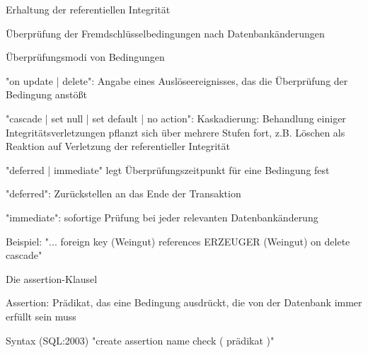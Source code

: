 \documentclass[a4paper]{article}
\begin{document}
\begin{multicols}{3}
\begin{itemize*}
    Erhaltung der referentiellen Integrität
    \begin{itemize*}
        \item Überprüfung der Fremdschlüsselbedingungen nach Datenbankänderungen
        \item Überprüfungsmodi von Bedingungen
        \begin{itemize*}
            \item "on update | delete": Angabe eines Auslöseereignisses, das die Überprüfung der Bedingung anstößt
            \item "cascade | set null | set default | no action": Kaskadierung: Behandlung einiger Integritätsverletzungen pflanzt sich über mehrere Stufen fort, z.B. Löschen als Reaktion auf Verletzung der referentieller Integrität
            \item "deferred | immediate" legt Überprüfungszeitpunkt für eine Bedingung fest
            \item "deferred": Zurückstellen an das Ende der Transaktion
            \item "immediate": sofortige Prüfung bei jeder relevanten Datenbankänderung
            \item Beispiel: "... foreign key (Weingut) references ERZEUGER (Weingut) on delete cascade"
        \end{itemize*}
    \end{itemize*}

    Die assertion-Klausel
    \begin{itemize*}
        \item Assertion: Prädikat, das eine Bedingung ausdrückt, die von der Datenbank immer erfüllt sein muss
        \item Syntax (SQL:2003) "create assertion name check ( prädikat )"
    \end{itemize*}


\end{itemize*}
\end{multicols}
\end{document}
